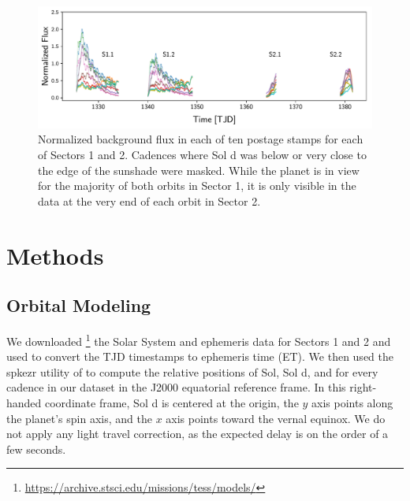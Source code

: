\documentclass[modern]{aastex62}
\begin{document}
\begin{figure}[t!]
    \begin{centering}
    \includegraphics[width=\linewidth]{figures/data.pdf}
    \caption{\label{fig:data}
             Normalized background flux in each of ten postage stamps
             for each of Sectors 1 and 2. Cadences where Sol d was
             below or very close to the edge of the sunshade were masked.
             While the planet is in view for the majority of both orbits
             in Sector 1, it is only visible in the data at the very end
             of each orbit in Sector 2.
             }
    \end{centering}
\end{figure}

\section{Methods}
\label{sec:methods}

\subsection{Orbital Modeling}
\label{sec:orbit}

We downloaded 
\footnote{\url{https://archive.stsci.edu/missions/tess/models/}}
the Solar System and \TESS ephemeris data for
Sectors 1 and 2 and used \spiceypy \citep{Acton1996, Acton2017, Annex2017}
to convert the TJD timestamps to 
ephemeris time (ET). We then used the \textsf{spkezr} utility of \spiceypy to compute
the relative positions of Sol, Sol d, and \TESS for every cadence
in our dataset in the J2000 equatorial reference frame. In this right-handed
coordinate frame, Sol d is centered at the origin, the $y$ axis points along the 
planet's spin axis, and the $x$ axis points toward the vernal equinox. We
do not apply any light travel correction, as the expected delay is on the order
of a few seconds.
\end{document}
